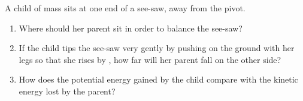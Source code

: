 
\begin{problem}[Robin6]
{A child of mass  sits at one end of a see-saw,  away from the pivot.
\begin{enumerate}
	\item Where should her  parent sit in order to balance the see-saw?
	\item If the child tips the see-saw very gently by pushing on the ground with her legs so that she rises by , how far will her parent fall on the other side?
	\item How does the potential energy gained by the child compare with the kinetic energy lost by the parent?
\end{enumerate}
}
{}
{}
\end{problem}